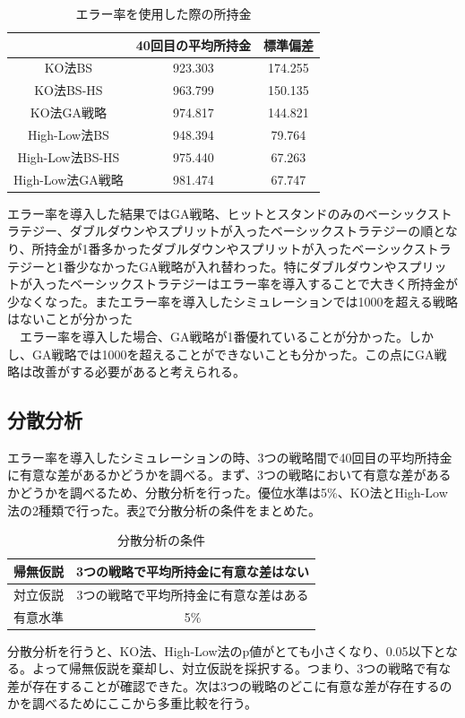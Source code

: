 \begin{table}[H]
 \caption{エラー率を使用した際の所持金\label{money-err}}
 \begin{center}
  \begin{tabular}{|c|c|c|}
  \hline  & 40回目の平均所持金 & 標準偏差 \\
  \hline KO法BS & 923.303 & 174.255\\
  \hline KO法BS-HS & 963.799 & 150.135 \\
  \hline KO法GA戦略 & 974.817 & 144.821\\
  \hline High-Low法BS & 948.394 & 79.764\\
  \hline High-Low法BS-HS  & 975.440 & 67.263\\
  \hline High-Low法GA戦略 & 981.474 & 67.747\\
  \hline
  \end{tabular}
 \end{center}
\end{table}
エラー率を導入した結果ではGA戦略、ヒットとスタンドのみのベーシックストラテジー、ダブルダウンやスプリットが入ったベーシックストラテジーの順となり、所持金が1番多かったダブルダウンやスプリットが入ったベーシックストラテジーと1番少なかったGA戦略が入れ替わった。特にダブルダウンやスプリットが入ったベーシックストラテジーはエラー率を導入することで大きく所持金が少なくなった。またエラー率を導入したシミュレーションでは1000を超える戦略はないことが分かった\\
　エラー率を導入した場合、GA戦略が1番優れていることが分かった。しかし、GA戦略では1000を超えることができないことも分かった。この点にGA戦略は改善がする必要があると考えられる。

\subsection{分散分析}
エラー率を導入したシミュレーションの時、3つの戦略間で40回目の平均所持金に有意な差があるかどうかを調べる。まず、3つの戦略において有意な差があるかどうかを調べるため、分散分析を行った。優位水準は5\%、KO法とHigh-Low法の2種類で行った。表\ref{conditions-b}で分散分析の条件をまとめた。
\begin{table}[H]
 \caption{分散分析の条件\label{conditions-b}}
 \begin{center}
  \begin{tabular}{|c|c|}
  \hline 帰無仮説 & 3つの戦略で平均所持金に有意な差はない \\
  \hline 対立仮説 & 3つの戦略で平均所持金に有意な差はある \\
  \hline 有意水準 & 5\% \\
  \hline
  \end{tabular}
 \end{center}
\end{table}
分散分析を行うと、KO法、High-Low法のp値がとても小さくなり、0.05以下となる。よって帰無仮説を棄却し、対立仮説を採択する。つまり、3つの戦略で有な差が存在することが確認できた。次は3つの戦略のどこに有意な差が存在するのかを調べるためにここから多重比較を行う。

